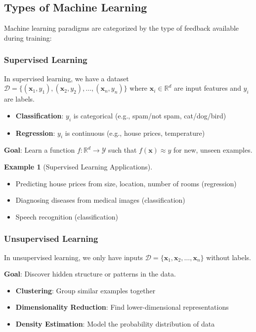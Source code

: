 \documentclass[11pt,twoside]{article}
\numberwithin{equation}{section}
\newcommand{\R}{\mathbb{R}}
\newcommand{\vect}[1]{\bm{#1}}
\theoremstyle{plain}
\theoremstyle{definition}
\newtheorem{example}[theorem]{Example}
\theoremstyle{remark}
\begin{document}
\subsection{Types of Machine Learning}

Machine learning paradigms are categorized by the type of feedback available during training:

\subsubsection{Supervised Learning}

In supervised learning, we have a dataset $\mathcal{D} = \{(\vect{x}_1, y_1), (\vect{x}_2, y_2), \ldots, (\vect{x}_n, y_n)\}$ where $\vect{x}_i \in \R^d$ are input features and $y_i$ are labels.

\begin{itemize}
\item \textbf{Classification}: $y_i$ is categorical (e.g., spam/not spam, cat/dog/bird)
\item \textbf{Regression}: $y_i$ is continuous (e.g., house prices, temperature)
\end{itemize}

\textbf{Goal}: Learn a function $f: \R^d \to \mathcal{Y}$ such that $f(\vect{x}) \approx y$ for new, unseen examples.

\begin{example}[Supervised Learning Applications]
\begin{itemize}
\item Predicting house prices from size, location, number of rooms (regression)
\item Diagnosing diseases from medical images (classification)
\item Speech recognition (classification)
\end{itemize}
\end{example}

\subsubsection{Unsupervised Learning}

In unsupervised learning, we only have inputs $\mathcal{D} = \{\vect{x}_1, \vect{x}_2, \ldots, \vect{x}_n\}$ without labels.

\textbf{Goal}: Discover hidden structure or patterns in the data.

\begin{itemize}
\item \textbf{Clustering}: Group similar examples together
\item \textbf{Dimensionality Reduction}: Find lower-dimensional representations
\item \textbf{Density Estimation}: Model the probability distribution of data
\end{itemize}
\end{document}
